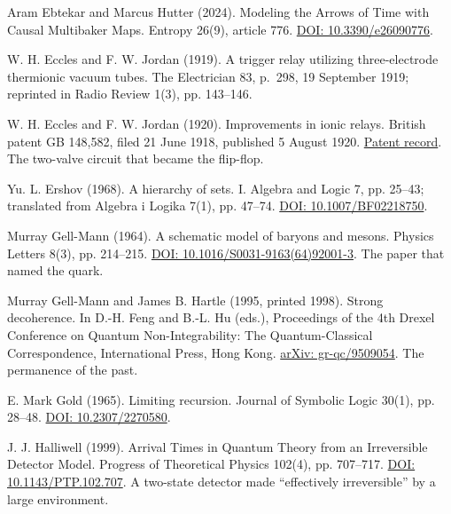 \noindent Aram Ebtekar and Marcus Hutter (2024). Modeling the Arrows of Time with Causal Multibaker Maps. Entropy 26(9), article 776. \href{https://doi.org/10.3390/e26090776}{DOI: 10.3390/e26090776}.
\par\medskip

\noindent W. H. Eccles and F. W. Jordan (1919). A trigger relay utilizing three-electrode thermionic vacuum tubes. The Electrician 83, p.~298, 19 September 1919; reprinted in Radio Review 1(3), pp. 143--146.
\par\medskip

\noindent W. H. Eccles and F. W. Jordan (1920). Improvements in ionic relays. British patent GB 148,582, filed 21 June 1918, published 5 August 1920. \href{https://patents.google.com/patent/GB148582A/en}{Patent record}. The two-valve circuit that became the flip-flop.
\par\medskip

\noindent Yu. L. Ershov (1968). A hierarchy of sets. I. Algebra and Logic 7, pp. 25--43; translated from Algebra i Logika 7(1), pp. 47--74. \href{https://doi.org/10.1007/BF02218750}{DOI: 10.1007/BF02218750}.
\par\medskip

\noindent Murray Gell-Mann (1964). A schematic model of baryons and mesons. Physics Letters 8(3), pp. 214--215. \href{https://doi.org/10.1016/S0031-9163(64)92001-3}{DOI: 10.1016/S0031-9163(64)92001-3}. The paper that named the quark.
\par\medskip

\noindent Murray Gell-Mann and James B. Hartle (1995, printed 1998). Strong decoherence. In D.-H. Feng and B.-L. Hu (eds.), Proceedings of the 4th Drexel Conference on Quantum Non-Integrability: The Quantum-Classical Correspondence, International Press, Hong Kong. \href{https://arxiv.org/abs/gr-qc/9509054}{arXiv: gr-qc/9509054}. The permanence of the past.
\par\medskip

\noindent E. Mark Gold (1965). Limiting recursion. Journal of Symbolic Logic 30(1), pp. 28--48. \href{https://doi.org/10.2307/2270580}{DOI: 10.2307/2270580}.
\par\medskip

\noindent J. J. Halliwell (1999). Arrival Times in Quantum Theory from an Irreversible Detector Model. Progress of Theoretical Physics 102(4), pp. 707--717. \href{https://doi.org/10.1143/PTP.102.707}{DOI: 10.1143/PTP.102.707}. A two-state detector made ``effectively irreversible'' by a large environment.
\par\medskip

